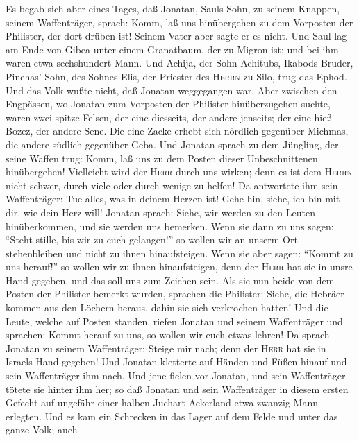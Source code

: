  Es begab sich aber eines Tages, daß Jonatan, Sauls Sohn,
zu seinem Knappen, seinem Waffenträger, sprach: Komm, laß uns
hinübergehen zu dem Vorposten der Philister, der dort drüben ist! Seinem
Vater aber sagte er es nicht.  Und Saul lag am Ende von
Gibea unter einem Granatbaum, der zu Migron ist; und bei ihm waren etwa
sechshundert Mann.  Und Achija, der Sohn Achitubs, Ikabods
Bruder, Pinehas' Sohn, des Sohnes Elis, der Priester des \textsc{Herrn}
zu Silo, trug das Ephod. Und das Volk wußte nicht, daß Jonatan
weggegangen war.  Aber zwischen den Engpässen, wo Jonatan
zum Vorposten der Philister hinüberzugehen suchte, waren zwei spitze
Felsen, der eine diesseits, der andere jenseits; der eine hieß Bozez,
der andere Sene.  Die eine Zacke erhebt sich nördlich
gegenüber Michmas, die andere südlich gegenüber Geba.  Und
Jonatan sprach zu dem Jüngling, der seine Waffen trug: Komm, laß uns zu
dem Posten dieser Unbeschnittenen hinübergehen! Vielleicht wird der
\textsc{Herr} durch uns wirken; denn es ist dem \textsc{Herrn} nicht
schwer, durch viele oder durch wenige zu helfen!  Da
antwortete ihm sein Waffenträger: Tue alles, was in deinem Herzen ist!
Gehe hin, siehe, ich bin mit dir, wie dein Herz will! 
Jonatan sprach: Siehe, wir werden zu den Leuten hinüberkommen, und sie
werden uns bemerken.  Wenn sie dann zu uns sagen: ``Steht
stille, bis wir zu euch gelangen!'' so wollen wir an unserm Ort
stehenbleiben und nicht zu ihnen hinaufsteigen.  Wenn sie
aber sagen: ``Kommt zu uns herauf!'' so wollen wir zu ihnen
hinaufsteigen, denn der \textsc{Herr} hat sie in unsre Hand gegeben, und
das soll uns zum Zeichen sein.  Als sie nun beide von dem
Posten der Philister bemerkt wurden, sprachen die Philister: Siehe, die
Hebräer kommen aus den Löchern heraus, dahin sie sich verkrochen hatten!
 Und die Leute, welche auf Posten standen, riefen Jonatan
und seinem Waffenträger und sprachen: Kommt herauf zu uns, so wollen wir
euch etwas lehren! Da sprach Jonatan zu seinem Waffenträger: Steige mir
nach; denn der \textsc{Herr} hat sie in Israels Hand gegeben!
 Und Jonatan kletterte auf Händen und Füßen hinauf und
sein Waffenträger ihm nach. Und jene fielen vor Jonatan, und sein
Waffenträger tötete sie hinter ihm her;  so daß Jonatan
und sein Waffenträger in diesem ersten Gefecht auf ungefähr einer halben
Juchart Ackerland etwa zwanzig Mann erlegten.  Und es kam
ein Schrecken in das Lager auf dem Felde und unter das ganze Volk; auch
